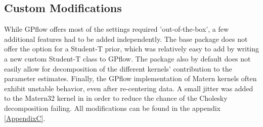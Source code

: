 \subsection{Custom Modifications}

While GPflow offers most of the settings required 'out-of-the-box', a few additional features had to be added independently. The base package does not offer the option for a Student-T prior, which was relatively easy to add by writing a new custom Student-T class to GPflow. The package also by default does not easily allow for decomposition of the different kernels' contribution to the parameter estimates. Finally, the GPflow implementation of Matern kernels often exhibit unstable behavior, even after re-centering data. A small jitter was added to the Matern32 kernel in in order to reduce the chance of the Cholesky decomposition failing. All modifications can be found in the appendix \ref{AppendixC}.
